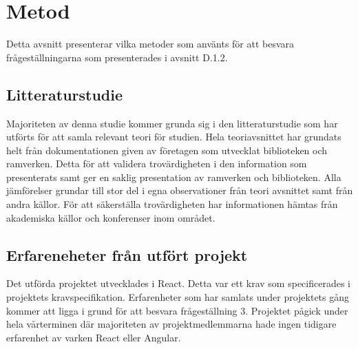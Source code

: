 \section{Metod}
\label{sec:axel-method}

Detta avsnitt presenterar vilka metoder som använts för att besvara frågeställningarna som presenterades i avsnitt D.1.2.

\subsection{Litteraturstudie}
Majoriteten av denna studie kommer grunda sig i den litteraturstudie som har utförts för att samla relevant teori för studien. Hela teoriavsnittet har grundats helt från dokumentationen given av företagen som utvecklat biblioteken och ramverken. Detta för att validera trovärdigheten i den information som presenterats samt ger en saklig presentation av ramverken och biblioteken. Alla jämförelser grundar till stor del i egna observationer från teori avsnittet samt från andra källor. För att säkerställa trovärdigheten har informationen hämtas från akademiska källor och konferenser inom området.

\subsection{Erfareneheter från utfört projekt}
Det utförda projektet utvecklades i React. Detta var ett krav som specificerades i projektets kravspecifikation. Erfarenheter som har samlats under projektets gång kommer att ligga i grund för att besvara frågeställning 3. Projektet pågick under hela vårterminen där majoriteten av projektmedlemmarna hade ingen tidigare erfarenhet av varken React eller Angular.

